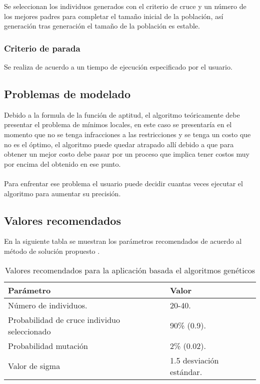 Se seleccionan los individuos generados con el criterio de cruce y un número de los mejores padres para completar el tamaño inicial de la población, así generación tras generación el tamaño de la población es estable.

\subsubsection{Criterio de parada}

Se realiza de acuerdo a un tiempo de ejecución especificado por el usuario.

\subsection{Problemas de modelado} \label{sec:genProblema}

Debido a la formula de la función de aptitud, el algoritmo teóricamente debe presentar el problema de mínimos locales, en este caso se presentaría en el momento que no se tenga infracciones a las restricciones y se tenga un costo que no es el óptimo, el algoritmo puede quedar atrapado allí debido a que para obtener un mejor costo debe pasar por un proceso que implica tener costos muy por encima del obtenido en ese punto.
\\\\
Para enfrentar ese problema el usuario puede decidir cuantas veces ejecutar el algoritmo para aumentar su precisión.

\subsection{Valores recomendados}

En la siguiente tabla se muestran los parámetros recomendados de acuerdo al método de solución propuesto \cite{4554416}.

\begin{center}
\begin{longtable}{|p{7cm}|p{7cm}|}
	\caption{Valores recomendados para la aplicación basada el algoritmos genéticos} \label{tabla:paramgenetico}\\
	\hline
	\cellcolor[gray]{0.9} \textbf{Parámetro} & \cellcolor[gray]{0.9}\textbf{Valor} \\
	\hline
	Número de individuos. & 20-40.\\
	\hline
	Probabilidad de cruce individuo seleccionado& 90\% (0.9).\\
	\hline
	Probabilidad mutación & 2\% (0.02).\\
	\hline
	Valor de sigma & 1.5 desviación estándar.\\
	\hline
\end{longtable}	
\end{center}

